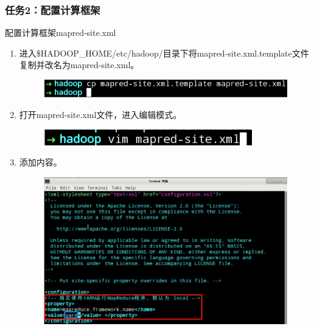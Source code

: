 \documentclass {article}
\begin{document}
			\subsubsection{任务2：配置计算框架}
				配置计算框架mapred-site.xml
				\begin{enumerate}
					\item 进入\$HADOOP\_HOME/etc/hadoop/目录下将mapred-site.xml.template文件复制并改名为mapred-site.xml。
					\begin{figure}[H]
						\centering
						\includegraphics[width=4.5in]{figures/fig35.png}
					\end{figure}
				
					\item 打开mapred-site.xml文件，进入编辑模式。
					\begin{figure}[H]
						\centering
						\includegraphics{figures/fig36.png}
					\end{figure}
				
					\item 添加内容。
					\begin{figure}[H]
						\centering
						\includegraphics[width=4.5in]{figures/fig37.png}
					\end{figure}
				\end{enumerate}
			
\end{document}
